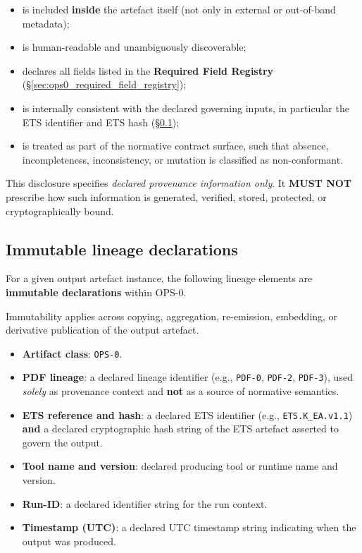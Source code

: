 \begin{itemize}
  \item is included \textbf{inside} the artefact itself
        (not only in external or out-of-band metadata);
  \item is human-readable and unambiguously discoverable;
  \item declares all fields listed in the
        \textbf{Required Field Registry}
        (\S\ref{sec:ops0_required_field_registry});
  \item is internally consistent with the declared governing inputs,
        in particular the ETS identifier and ETS hash
        (\S\ref{sec:ops0_immutability_stop});
  \item is treated as part of the normative contract surface,
        such that absence, incompleteness, inconsistency,
        or mutation is classified as non-conformant.
\end{itemize}

This disclosure specifies \emph{declared provenance information only}.
It \textbf{MUST NOT} prescribe how such information is generated,
verified, stored, protected,
or cryptographically bound.

\subsection{Immutable lineage declarations}
\label{sec:ops0_immutability_stop}
For a given output artefact instance,
the following lineage elements are
\textbf{immutable declarations} within OPS-0.

Immutability applies across
copying, aggregation, re-emission,
embedding, or derivative publication
of the output artefact.

\begin{itemize}
  \item \textbf{Artifact class}: \texttt{OPS-0}.
  \item \textbf{PDF lineage}: a declared lineage identifier
        (e.g., \texttt{PDF-0}, \texttt{PDF-2}, \texttt{PDF-3}),
        used \emph{solely} as provenance context and
        \textbf{not} as a source of normative semantics.
  \item \textbf{ETS reference and hash}:
        a declared ETS identifier
        (e.g., \texttt{ETS.K\_EA.v1.1})
        \textbf{and} a declared cryptographic hash string
        of the ETS artefact asserted to govern the output.
  \item \textbf{Tool name and version}:
        declared producing tool or runtime name and version.
  \item \textbf{Run-ID}:
        a declared identifier string for the run context.
  \item \textbf{Timestamp (UTC)}:
        a declared UTC timestamp string indicating
        when the output was produced.
\end{itemize}

